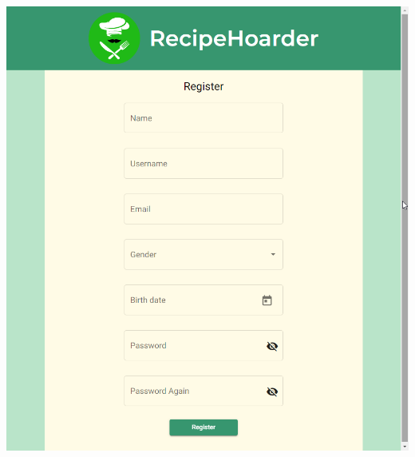 \documentclass[12pt]{report}
\theoremstyle{definition}
\begin{document}
\includegraphics[scale=0.4]{pictures/web_register.png}
\end{document}
